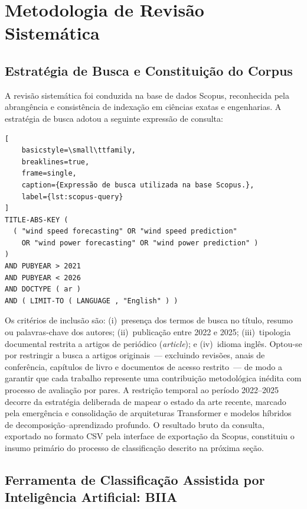 \section{Metodologia de Revisão Sistemática}

\subsection{Estratégia de Busca e Constituição do Corpus}

A revisão sistemática foi conduzida na base de dados Scopus,
reconhecida pela abrangência e consistência de indexação em ciências
exatas e engenharias. A estratégia de busca adotou a seguinte
expressão de consulta:

\begin{lstlisting}[
    basicstyle=\small\ttfamily,
    breaklines=true,
    frame=single,
    caption={Expressão de busca utilizada na base Scopus.},
    label={lst:scopus-query}
]
TITLE-ABS-KEY (
  ( "wind speed forecasting" OR "wind speed prediction"
    OR "wind power forecasting" OR "wind power prediction" )
)
AND PUBYEAR > 2021
AND PUBYEAR < 2026
AND DOCTYPE ( ar )
AND ( LIMIT-TO ( LANGUAGE , "English" ) )
\end{lstlisting}

Os critérios de inclusão são: (i)~presença dos termos de busca no
título, resumo ou palavras-chave dos autores; (ii)~publicação entre
2022 e 2025; (iii)~tipologia documental restrita a artigos de
periódico (\textit{article}); e (iv)~idioma inglês. Optou-se por
restringir a busca a artigos originais~--- excluindo revisões,
anais de conferência, capítulos de livro e documentos de acesso
restrito~--- de modo a garantir que cada trabalho represente uma
contribuição metodológica inédita com processo de avaliação por
pares. A restrição temporal ao período 2022--2025 decorre da
estratégia deliberada de mapear o estado da arte recente, marcado
pela emergência e consolidação de arquiteturas Transformer e modelos
híbridos de decomposição--aprendizado profundo. O resultado bruto
da consulta, exportado no formato CSV pela interface de exportação
da Scopus, constituiu o insumo primário do processo de
classificação descrito na próxima seção.


\subsection{Ferramenta de Classificação Assistida por Inteligência
            Artificial: BIIA}

